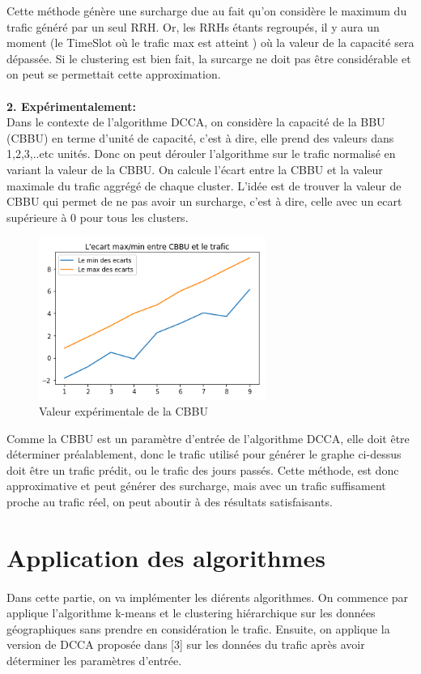 \documentclass{report}
\begin{document}
Cette méthode génère une surcharge due au fait qu'on considère le maximum du trafic généré par un seul RRH. Or, les RRHs 
étants regroupés, il y aura un moment (le TimeSlot où le trafic max est atteint ) où la valeur de la capacité sera dépassée. 
Si le clustering est bien fait, la surcarge ne doit pas être considérable et on peut se permettait cette approximation.\\\\
\textbf{2. Expérimentalement: }\\
Dans le contexte de l'algorithme DCCA, on considère la capacité de la BBU (CBBU) en terme d'unité de capacité, c'est à dire, elle prend des valeurs 
dans 1,2,3,..etc unités. Donc on peut dérouler l'algorithme sur le trafic normalisé en variant la valeur de la CBBU. On calcule l'écart entre la CBBU et 
la valeur maximale du trafic aggrégé de chaque cluster. L'idée est de trouver la valeur de CBBU qui permet de ne pas avoir un surcharge, 
c'est à dire, celle avec un ecart supérieure à 0 pour tous les clusters. 
\begin{figure}[H]
  \centering
  \includegraphics[width=20em]{images/ecartBBU.png}
  \caption{Valeur expérimentale de la CBBU }
\end{figure} 
Comme la CBBU est un paramètre d'entrée de l'algorithme DCCA, elle doit être déterminer préalablement, donc le trafic utilisé pour 
générer le graphe ci-dessus doit être un trafic prédit, ou le trafic des jours passés. Cette méthode, est donc approximative et peut générer 
des surcharge, mais avec un trafic suffisament proche au trafic réel, on peut aboutir à des résultats satisfaisants.
\section{Application des algorithmes}
\paragraph{}
Dans cette partie, on va implémenter les diérents algorithmes. On commence par applique l'algorithme k-means et le clustering 
hiérarchique sur les données géographiques sans prendre en considération le trafic. Ensuite, on applique la version 
de DCCA proposée dans [3] sur les données du trafic après avoir déterminer les paramètres d'entrée.
\end{document}
